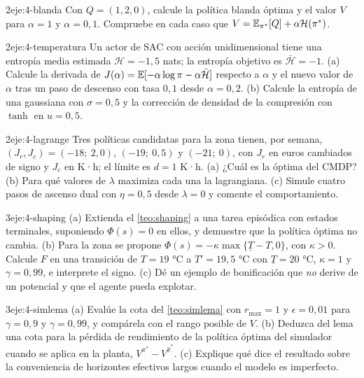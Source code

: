 \begin{ejercicio}{2}{eje:4-blanda}
Con $Q=(1,2,0)$, calcule la política blanda óptima y el valor $V$ para $\alpha=1$ y $\alpha=0{,}1$. Compruebe en cada caso que $V=\mathbb{E}_{\pi^{*}}[Q]+\alpha\mathcal H(\pi^{*})$.
\end{ejercicio}

\begin{ejercicio}{2}{eje:4-temperatura}
Un actor de SAC con acción unidimensional tiene una entropía media estimada $\mathcal H=-1{,}5$ nats; la entropía objetivo es $\bar{\mathcal H}=-1$. (a) Calcule la derivada de $J(\alpha)=\mathbb{E}[-\alpha\log\pi-\alpha\bar{\mathcal H}]$ respecto a $\alpha$ y el nuevo valor de $\alpha$ tras un paso de descenso con tasa $0{,}1$ desde $\alpha=0{,}2$. (b) Calcule la entropía de una gaussiana con $\sigma=0{,}5$ y la corrección de densidad de la compresión con $\tanh$ en $u=0{,}5$.
\end{ejercicio}

\begin{ejercicio}{2}{eje:4-lagrange}
Tres políticas candidatas para la zona tienen, por semana, $(J_r,J_c)=(-18;\ 2{,}0)$, $(-19;\ 0{,}5)$ y $(-21;\ 0)$, con $J_r$ en euros cambiados de signo y $J_c$ en K·h; el límite es $d=1$ K·h. (a) ¿Cuál es la óptima del CMDP? (b) Para qué valores de $\lambda$ maximiza cada una la lagrangiana. (c) Simule cuatro pasos de ascenso dual con $\eta=0{,}5$ desde $\lambda=0$ y comente el comportamiento.
\end{ejercicio}

\begin{ejercicio}{3}{eje:4-shaping}
(a) Extienda el \cref{teo:shaping} a una tarea episódica con estados terminales, suponiendo $\Phi(s)=0$ en ellos, y demuestre que la política óptima no cambia. (b) Para la zona se propone $\Phi(s)=-\kappa\max\{\underline T-T,0\}$, con $\kappa>0$. Calcule $F$ en una transición de $T=19$ °C a $T'=19{,}5$ °C con $\underline T=20$ °C, $\kappa=1$ y $\gamma=0{,}99$, e interprete el signo. (c) Dé un ejemplo de bonificación que \emph{no} derive de un potencial y que el agente pueda explotar.
\end{ejercicio}

\begin{ejercicio}{3}{eje:4-simlema}
(a) Evalúe la cota del \cref{teo:simlema} con $r_{\max}=1$ y $\epsilon=0{,}01$ para $\gamma=0{,}9$ y $\gamma=0{,}99$, y compárela con el rango posible de $V$. (b) Deduzca del lema una cota para la pérdida de rendimiento de la política óptima del simulador cuando se aplica en la planta, $V^{\pi^{*}}-V^{\hat\pi^{*}}$. (c) Explique qué dice el resultado sobre la conveniencia de horizontes efectivos largos cuando el modelo es imperfecto.
\end{ejercicio}
